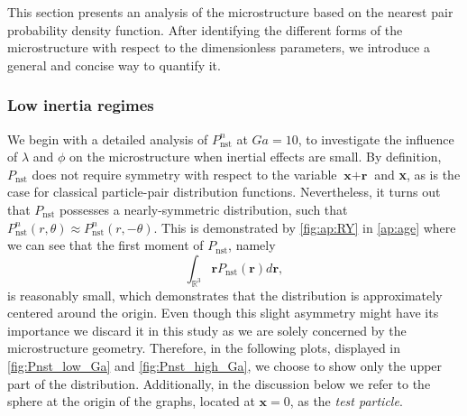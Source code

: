 This section presents an analysis of the microstructure based on the nearest pair probability density function. %
After identifying the different forms of the microstructure with respect to the dimensionless parameters, we introduce a general and concise way to quantify it.


\subsubsection*{Low inertia regimes}
We begin with a detailed analysis of $P_\text{nst}^n$ at $Ga =10$, to investigate the influence of $\lambda$ and $\phi$ on the microstructure when inertial effects are small.
By definition, $P_\text{nst}$ does not require symmetry with respect to the variable $\textbf{x}+\textbf{r}$ and \textbf{x}, as is the case for classical particle-pair distribution functions. 
Nevertheless, it turns out that $P_\text{nst}$ possesses a nearly-symmetric distribution, such that  $P_\text{nst}^n(r,\theta)\approx P_\text{nst}^n(r,- \theta)$. 
This is demonstrated by \ref{fig:ap:RY} in \ref{ap:age} where we can see that the first moment of $P_\text{nst}$, namely
\begin{equation*}
    \int_{\mathbb{R}^3} \textbf{r} P_\text{nst}(\textbf{r}) d\textbf{r},
\end{equation*}
is reasonably small, which demonstrates that the distribution is approximately centered around the origin. 
Even though this slight asymmetry might have its importance \cite{zhang2023evolution} we discard it in this study as we are solely concerned by the microstructure geometry. 
Therefore, in the following plots, displayed in \ref{fig:Pnst_low_Ga} and \ref{fig:Pnst_high_Ga}, we choose to show only the upper part of the distribution.
Additionally, in the discussion below we refer to the sphere at the origin of the graphs, located at $\textbf{x}=0$, as the \textit{test particle}.%

